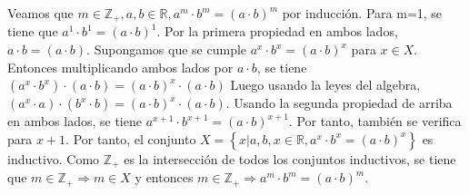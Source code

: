 \documentclass{article}
\begin{document}
\newline
Veamos que \(m\in \mathbb{Z}_{+},a,b\in\mathbb{R},a^{m}\cdot b^{m}=\left( a\cdot b\right)^m\) por inducción. Para m=1, se tiene que \(a^{1}\cdot b^{1}=\left( a\cdot b\right)^1\). Por la primera propiedad en ambos lados, \(a\cdot b=\left( a\cdot b\right)\). Supongamos que se cumple \(a^{x}\cdot b^{x}=\left( a\cdot b\right)^x\) para \(x\in X\). Entonces multiplicando ambos lados por \(a \cdot b\), se tiene \(\left(a^{x}\cdot b^{x}\right)\cdot \left(a \cdot b\right)=\left( a\cdot b\right)^x\cdot \left(a \cdot b\right)\) Luego usando la leyes del algebra, \(\left(a^{x}\cdot a\right)\cdot \left( b^{x}\cdot b\right)=\left( a\cdot b\right)^x\cdot \left(a \cdot b\right)\). Usando la segunda propiedad de arriba en ambos lados, se tiene \(a^{x+1}\cdot  b^{x+1}=\left( a\cdot b\right)^{x+1}\). Por tanto, también se verifica para \(x+1\). Por tanto, el conjunto \(X=\left\{x|a,b,x\in \mathbb{R},a^{x}\cdot  b^{x}= \left(a\cdot b\right)^{x}\right\}\) es inductivo. Como \(\mathbb{Z}_{+}\) es la intersección de todos los conjuntos inductivos, se tiene que \(m \in \mathbb{Z}_{+}\Rightarrow m \in X\) y entonces \(m\in \mathbb{Z}_{+}\Rightarrow a^{m}\cdot  b^{m}= \left(a\cdot b\right)^{m}\).
\end{document}
